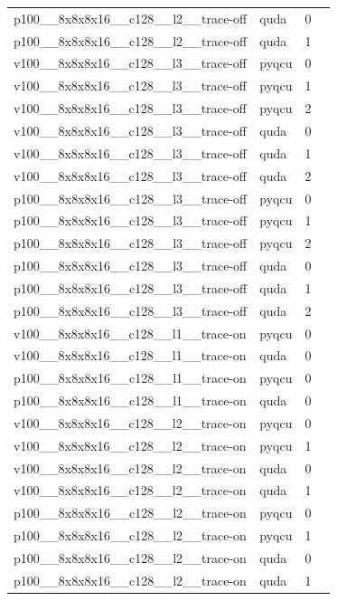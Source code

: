 \begin{table}[htbp]
\begin{tabular}{@{}llrr@{}}
p100\_\_8x8x8x16\_\_c128\_\_l2\_\_trace-off & quda & 0 &  \\
p100\_\_8x8x8x16\_\_c128\_\_l2\_\_trace-off & quda & 1 &  \\
v100\_\_8x8x8x16\_\_c128\_\_l3\_\_trace-off & pyqcu & 0 &  \\
v100\_\_8x8x8x16\_\_c128\_\_l3\_\_trace-off & pyqcu & 1 &  \\
v100\_\_8x8x8x16\_\_c128\_\_l3\_\_trace-off & pyqcu & 2 &  \\
v100\_\_8x8x8x16\_\_c128\_\_l3\_\_trace-off & quda & 0 &  \\
v100\_\_8x8x8x16\_\_c128\_\_l3\_\_trace-off & quda & 1 &  \\
v100\_\_8x8x8x16\_\_c128\_\_l3\_\_trace-off & quda & 2 &  \\
p100\_\_8x8x8x16\_\_c128\_\_l3\_\_trace-off & pyqcu & 0 &  \\
p100\_\_8x8x8x16\_\_c128\_\_l3\_\_trace-off & pyqcu & 1 &  \\
p100\_\_8x8x8x16\_\_c128\_\_l3\_\_trace-off & pyqcu & 2 &  \\
p100\_\_8x8x8x16\_\_c128\_\_l3\_\_trace-off & quda & 0 &  \\
p100\_\_8x8x8x16\_\_c128\_\_l3\_\_trace-off & quda & 1 &  \\
p100\_\_8x8x8x16\_\_c128\_\_l3\_\_trace-off & quda & 2 &  \\
v100\_\_8x8x8x16\_\_c128\_\_l1\_\_trace-on & pyqcu & 0 &  \\
v100\_\_8x8x8x16\_\_c128\_\_l1\_\_trace-on & quda & 0 &  \\
p100\_\_8x8x8x16\_\_c128\_\_l1\_\_trace-on & pyqcu & 0 &  \\
p100\_\_8x8x8x16\_\_c128\_\_l1\_\_trace-on & quda & 0 &  \\
v100\_\_8x8x8x16\_\_c128\_\_l2\_\_trace-on & pyqcu & 0 &  \\
v100\_\_8x8x8x16\_\_c128\_\_l2\_\_trace-on & pyqcu & 1 &  \\
v100\_\_8x8x8x16\_\_c128\_\_l2\_\_trace-on & quda & 0 &  \\
v100\_\_8x8x8x16\_\_c128\_\_l2\_\_trace-on & quda & 1 &  \\
p100\_\_8x8x8x16\_\_c128\_\_l2\_\_trace-on & pyqcu & 0 &  \\
p100\_\_8x8x8x16\_\_c128\_\_l2\_\_trace-on & pyqcu & 1 &  \\
p100\_\_8x8x8x16\_\_c128\_\_l2\_\_trace-on & quda & 0 &  \\
p100\_\_8x8x8x16\_\_c128\_\_l2\_\_trace-on & quda & 1 &  \\

\end{tabular}
\end{table}
